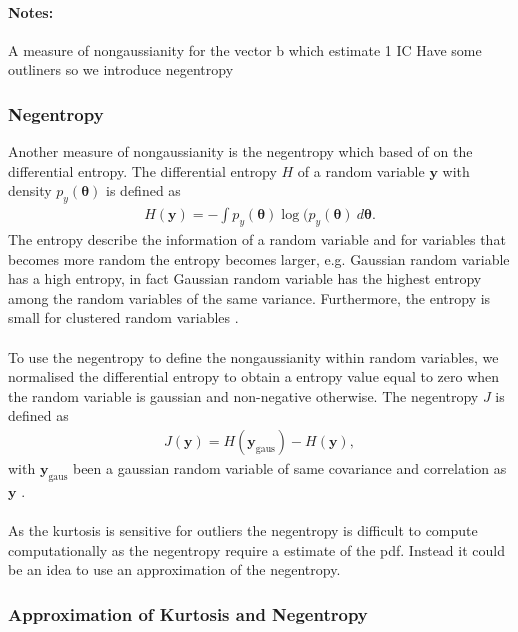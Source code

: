 \paragraph{Notes:}
A measure of nongaussianity for the vector b which estimate 1 IC
Have some outliners so we introduce negentropy

\subsubsection{Negentropy}
Another measure of nongaussianity is the negentropy which based of on the differential entropy. The differential entropy $H$ of a random variable $\mathbf{y}$ with density $p_y (\boldsymbol{\theta})$ is defined as
\begin{align*}
H(\mathbf{y}) = - \int p_y (\boldsymbol{\theta}) \log (p_y (\boldsymbol{\theta}) \ d\boldsymbol{\theta}.
\end{align*}
The entropy describe the information of a random variable and for variables that becomes more random the entropy becomes larger, e.g. Gaussian random variable has a high entropy, in fact Gaussian random variable has the highest entropy among the random variables of the same variance. Furthermore, the entropy is small for clustered random variables \cite[p. 182]{ICA}.
\\ \\
To use the negentropy to define the nongaussianity within random variables, we normalised the differential entropy to obtain a entropy value equal to zero when the random variable is gaussian and non-negative otherwise. The negentropy $J$ is defined as 
\begin{align*}
J(\mathbf{y}) = H(\mathbf{y}_{\text{gaus}}) - H(\mathbf{y}),
\end{align*}
with $\mathbf{y}_{\text{gaus}}$ been a gaussian random variable of same covariance and correlation as $\mathbf{y}$ \cite[p. 182]{ICA}.
\\ \\
As the kurtosis is sensitive for outliers the negentropy is difficult to compute computationally as the negentropy require a estimate of the pdf. Instead it could be an idea to use an approximation of the negentropy.
 
\subsubsection{Approximation of Kurtosis and Negentropy}



